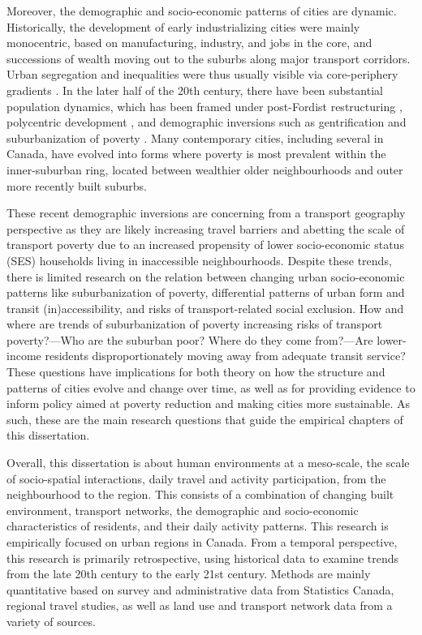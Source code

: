 Moreover, the demographic and socio-economic patterns of cities are dynamic. Historically, the development of early industrializing cities were mainly monocentric, based on manufacturing, industry, and jobs in the core, and successions of wealth moving out to the suburbs along major transport corridors. Urban segregation and inequalities were thus usually visible via core-periphery gradients \cite{burgess_growth_1925,alonso_location_1964,glaeser_sprawl_2004}. In the later half of the 20th century, there have been substantial population dynamics, which has been framed under post-Fordist restructuring \cite{walks_social_2001}, polycentric development \cite{anas_urban_1998}, and demographic inversions \cite{ehrenhalt_great_2012} such as gentrification \cite{vigdor_does_2002} and suburbanization of poverty \cite{ades_are_2012}. Many contemporary cities, including several in Canada, have evolved into forms where poverty is most prevalent within the inner-suburban ring, located between wealthier older neighbourhoods and outer more recently built suburbs.


These recent demographic inversions are concerning from a transport geography perspective as they are likely increasing travel barriers and abetting the scale of transport poverty due to an increased propensity of lower socio-economic status (SES) households living in inaccessible neighbourhoods. Despite these trends, there is limited research on the relation between changing urban socio-economic patterns like suburbanization of poverty, differential patterns of urban form and transit (in)accessibility, and risks of transport-related social exclusion. How and where are trends of suburbanization of poverty increasing risks of transport poverty?---Who are the suburban poor? Where do they come from?---Are lower-income residents disproportionately moving away from adequate transit service? These questions have implications for both theory on how the structure and patterns of cities evolve and change over time, as well as for providing evidence to inform policy aimed at poverty reduction and making cities more sustainable. As such, these are the main research questions that guide the empirical chapters of this dissertation.


Overall, this dissertation is about human environments at a meso-scale, the scale of socio-spatial interactions, daily travel and activity participation, from the neighbourhood to the region. This consists of a combination of changing built environment, transport networks, the demographic and socio-economic characteristics of residents, and their daily activity patterns. This research is empirically focused on urban regions in Canada. From a temporal perspective, this research is primarily retrospective, using historical data to examine trends from the late 20th century to the early 21st century. Methods are mainly quantitative based on survey and administrative data from Statistics Canada, regional travel studies, as well as land use and transport network data from a variety of sources. 

